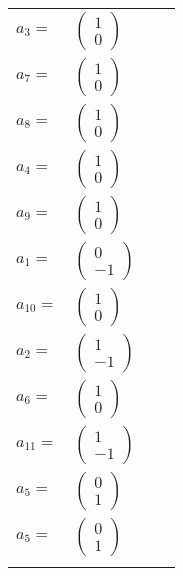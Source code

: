 \documentclass[1p]{elsarticle_modified}
\theoremstyle{definition}
\begin{document}
\begin{tabular}{m{7pt} m{180pt} m{7pt} m{180pt} }
\flushright $a_{3}=$&$\begin{pmatrix}1\\0\end{pmatrix}$ \\
\flushright $a_{7}=$&$\begin{pmatrix}1\\0\end{pmatrix}$ \\
\flushright $a_{8}=$&$\begin{pmatrix}1\\0\end{pmatrix}$ \\
\flushright $a_{4}=$&$\begin{pmatrix}1\\0\end{pmatrix}$ \\
\flushright $a_{9}=$&$\begin{pmatrix}1\\0\end{pmatrix}$ \\
\flushright $a_{1}=$&$\begin{pmatrix}0\\-1\end{pmatrix}$ \\
\flushright $a_{10}=$&$\begin{pmatrix}1\\0\end{pmatrix}$ \\
\flushright $a_{2}=$&$\begin{pmatrix}1\\-1\end{pmatrix}$ \\
\flushright $a_{6}=$&$\begin{pmatrix}1\\0\end{pmatrix}$ \\
\flushright $a_{11}=$&$\begin{pmatrix}1\\-1\end{pmatrix}$ \\
\flushright $a_{5}=$&$\begin{pmatrix}0\\1\end{pmatrix}$\\ \flushright $a_{5}=$&$\begin{pmatrix}0\\1\end{pmatrix}$\\&\end{tabular}
\end{document}
